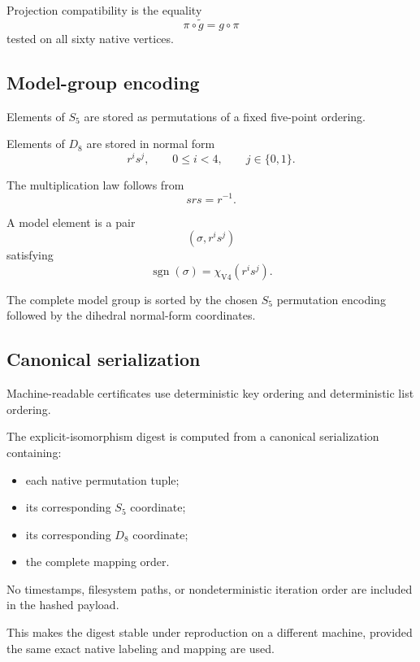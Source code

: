 Projection compatibility is the equality
\[
\pi\circ\widetilde g=g\circ\pi
\]
tested on all sixty native vertices.

\subsection{Model-group encoding}

Elements of $S_5$ are stored as permutations of a fixed five-point
ordering.

Elements of $D_8$ are stored in normal form
\[
r^i s^j,
\qquad
0\leq i<4,
\qquad
j\in\{0,1\}.
\]

The multiplication law follows from
\[
srs=r^{-1}.
\]

A model element is a pair
\[
(\sigma,r^i s^j)
\]
satisfying
\[
\operatorname{sgn}(\sigma)
=
\chi_{\mathrm{V4}}(r^i s^j).
\]

The complete model group is sorted by the chosen $S_5$ permutation
encoding followed by the dihedral normal-form coordinates.

\subsection{Canonical serialization}

Machine-readable certificates use deterministic key ordering and
deterministic list ordering.

The explicit-isomorphism digest is computed from a canonical
serialization containing:

\begin{itemize}
\item each native permutation tuple;
\item its corresponding $S_5$ coordinate;
\item its corresponding $D_8$ coordinate;
\item the complete mapping order.
\end{itemize}

No timestamps, filesystem paths, or nondeterministic iteration order are
included in the hashed payload.

This makes the digest stable under reproduction on a different machine,
provided the same exact native labeling and mapping are used.

